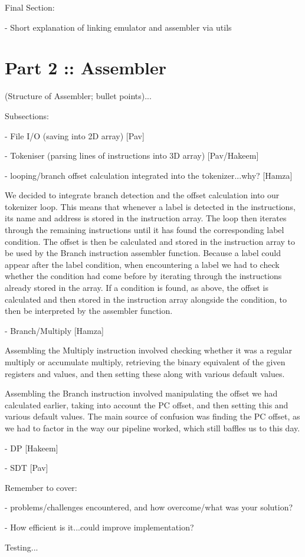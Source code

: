 Final Section:

- Short explanation of linking emulator and assembler via utils

 

 

\section{Part 2 :: Assembler}

 

(Structure of Assembler; bullet points)...

 

Subsections:

- File I/O (saving into 2D array) [Pav]

- Tokeniser (parsing lines of instructions into 3D array) [Pav/Hakeem]

- looping/branch offset calculation integrated into the tokenizer...why? [Hamza]

We decided to integrate branch detection and the offset calculation into our tokenizer loop. This means that whenever a label is detected in the instructions, its name and address is stored in the instruction array. The loop then iterates through the remaining instructions until it has found the corresponding label condition. The offset is then be calculated and stored in the instruction array to be used by the Branch instruction assembler function. Because a label could appear after the label condition, when encountering a label we had to check whether the condition had come before by iterating through the instructions already stored in the array. If a condition is found, as above, the offset is calculated and then stored in the instruction array alongside the condition, to then be interpreted by the assembler function.

 

-       Branch/Multiply [Hamza]

Assembling the Multiply instruction involved checking whether it was a regular multiply or accumulate multiply, retrieving the binary equivalent of the given registers and values, and then setting these along with various default values.

Assembling the Branch instruction involved manipulating the offset we had calculated earlier, taking into account the PC offset, and then setting this and various default values. The main source of confusion was finding the PC offset, as we had to factor in the way our pipeline worked, which still baffles us to this day.

 

 

 

- DP [Hakeem]

- SDT [Pav]

 

Remember to cover:

- problems/challenges encountered, and how overcome/what was your solution?

- How efficient is it...could improve implementation?

 

Testing...
